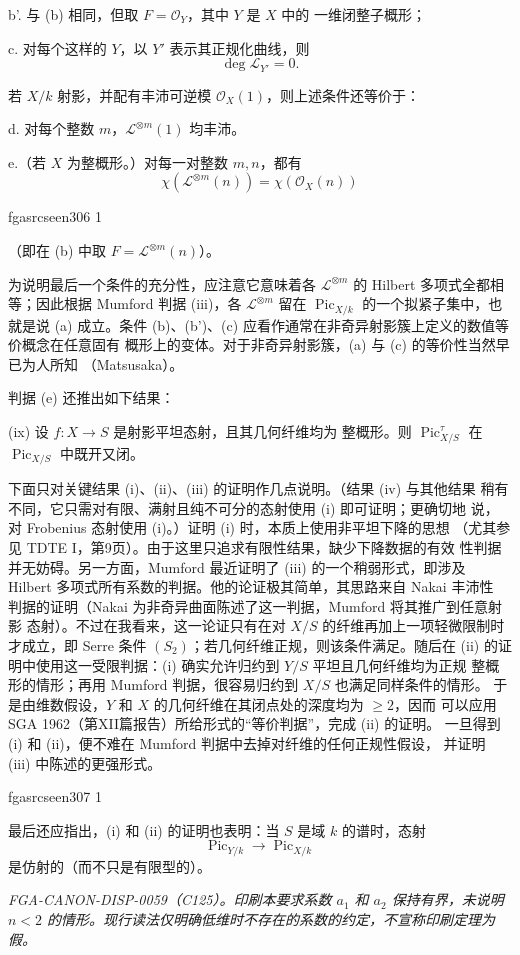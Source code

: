 \documentclass[12pt,twoside,openany]{book}
\numberwithin{equation}{section}
\newcommand{\fgaunitid}{unbound}
\newcommand{\src}[1]{%
  \phantomsection
  \hypertarget{src:\fgaunitid:#1}{}%
  \hypertarget{fga.\fgaunitid.p#1}{}%
  \ifcsname fgasrcseen#1\endcsname\else
    \expandafter\gdef\csname fgasrcseen#1\endcsname{1}%
    \hypertarget{src:#1}{}%
  \fi
  \marginpar{\raggedleft\footnotesize\sffamily #1}%
}
\theoremstyle{plain}
\theoremstyle{definition}
\theoremstyle{remark}
\begin{document}
\noindent b'. 与 (b) 相同，但取 $F=\mathcal O_Y$，其中 $Y$ 是 $X$ 中的
一维闭整子概形；

\noindent c. 对每个这样的 $Y$，以 $Y'$ 表示其正规化曲线，则
\[
\deg\mathcal L_{Y'}=0.
\]

若 $X/k$ 射影，并配有丰沛可逆模 $\mathcal O_X(1)$，则上述条件还等价于：

\noindent d. 对每个整数 $m$，$\mathcal L^{\otimes m}(1)$ 均丰沛。

\noindent e.（若 $X$ 为整概形。）对每一对整数 $m,n$，都有
\[
\chi(\mathcal L^{\otimes m}(n))=\chi(\mathcal O_X(n))
\]

\src{306}
（即在 (b) 中取 $F=\mathcal L^{\otimes m}(n)$）。

为说明最后一个条件的充分性，应注意它意味着各
$\mathcal L^{\otimes m}$ 的 Hilbert 多项式全都相等；因此根据 Mumford
判据 (iii)，各 $\mathcal L^{\otimes m}$ 留在
$\operatorname{Pic}_{X/k}$ 的一个拟紧子集中，也就是说 (a) 成立。条件
(b)、(b')、(c) 应看作通常在非奇异射影簇上定义的数值等价概念在任意固有
概形上的变体。对于非奇异射影簇，(a) 与 (c) 的等价性当然早已为人所知
（Matsusaka）。

判据 (e) 还推出如下结果：

\medskip
\noindent(ix) 设 $f:X\longrightarrow S$ 是射影平坦态射，且其几何纤维均为
整概形。则 $\operatorname{Pic}_{X/S}^\tau$ 在
$\operatorname{Pic}_{X/S}$ 中既开又闭。

下面只对关键结果 (i)、(ii)、(iii) 的证明作几点说明。（结果 (iv) 与其他结果
稍有不同，它只需对有限、满射且纯不可分的态射使用 (i) 即可证明；更确切地
说，对 Frobenius 态射使用 (i)。）证明 (i) 时，本质上使用非平坦下降的思想
（尤其参见 TDTE I，第9页）。由于这里只追求有限性结果，缺少下降数据的有效
性判据并无妨碍。另一方面，Mumford 最近证明了 (iii) 的一个稍弱形式，即涉及
Hilbert 多项式所有系数的判据。他的论证极其简单，其思路来自 Nakai 丰沛性
判据的证明（Nakai 为非奇异曲面陈述了这一判据，Mumford 将其推广到任意射影
态射）。不过在我看来，这一论证只有在对 $X/S$ 的纤维再加上一项轻微限制时
才成立，即 Serre 条件 $(S_2)$；若几何纤维正规，则该条件满足。随后在 (ii)
的证明中使用这一受限判据：(i) 确实允许归约到 $Y/S$ 平坦且几何纤维均为正规
整概形的情形；再用 Mumford 判据，很容易归约到 $X/S$ 也满足同样条件的情形。
于是由维数假设，$Y$ 和 $X$ 的几何纤维在其闭点处的深度均为 $\geq2$，因而
可以应用 SGA 1962（第XII篇报告）所给形式的“等价判据”，完成 (ii) 的证明。
一旦得到 (i) 和 (ii)，便不难在 Mumford 判据中去掉对纤维的任何正规性假设，
并证明 (iii) 中陈述的更强形式。

\src{307}
最后还应指出，(i) 和 (ii) 的证明也表明：当 $S$ 是域 $k$ 的谱时，态射
\[
\operatorname{Pic}_{Y/k}\longrightarrow\operatorname{Pic}_{X/k}
\]
是仿射的（而不只是有限型的）。

\par\smallskip
\begingroup\footnotesize
\noindent\textit{FGA-CANON-DISP-0059（C125）。印刷本要求系数 $a_1$ 和 $a_2$ 保持有界，未说明 $n<2$ 的情形。现行读法仅明确低维时不存在的系数的约定，不宣称印刷定理为假。}\par
\endgroup

\end{document}
